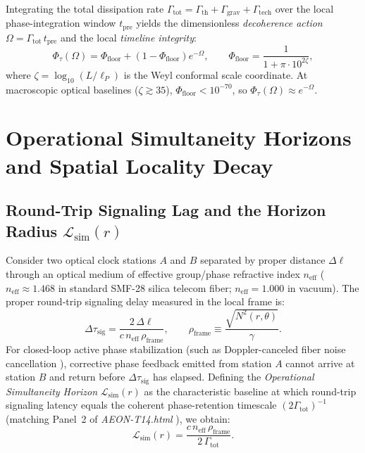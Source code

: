 \documentclass[11pt,a4paper]{article}
\begin{document}
Integrating the total dissipation rate $\Gamma_{\mathrm{tot}} = \Gamma_{\mathrm{th}} + \Gamma_{\mathrm{grav}} + \Gamma_{\mathrm{tech}}$ over the local phase-integration window $t_{\mathrm{pre}}$ yields the dimensionless \emph{decoherence action} $\Omega = \Gamma_{\mathrm{tot}}\,t_{\mathrm{pre}}$ and the local \emph{timeline integrity}:
\begin{equation}
\Phi_\tau(\Omega) = \Phi_{\mathrm{floor}} + \left(1 - \Phi_{\mathrm{floor}}\right)e^{-\Omega}, \qquad \Phi_{\mathrm{floor}} = \frac{1}{1 + \pi \cdot 10^{2\zeta}},
\label{eq:phitau}
\end{equation}
where $\zeta = \log_{10}(L / \ell_P)$ is the Weyl conformal scale coordinate. At macroscopic optical baselines ($\zeta \gtrsim 35$), $\Phi_{\mathrm{floor}} < 10^{-70}$, so $\Phi_\tau(\Omega) \approx e^{-\Omega}$.

\section{Operational Simultaneity Horizons and Spatial Locality Decay}

\subsection{Round-Trip Signaling Lag and the Horizon Radius $\mathcal{L}_{\mathrm{sim}}(r)$}

Consider two optical clock stations $A$ and $B$ separated by proper distance $\Delta\ell$ through an optical medium of effective group/phase refractive index $n_{\mathrm{eff}}$ ($n_{\mathrm{eff}} \approx 1.468$ in standard SMF-28 silica telecom fiber; $n_{\mathrm{eff}} = 1.000$ in vacuum). The proper round-trip signaling delay measured in the local frame is:
\begin{equation}
\Delta\tau_{\mathrm{sig}} = \frac{2\,\Delta\ell}{c\,n_{\mathrm{eff}}\,\rho_{\mathrm{frame}}}, \qquad \rho_{\mathrm{frame}} \equiv \frac{\sqrt{N^2(r,\theta)}}{\gamma}.
\label{eq:dtausig}
\end{equation}
For closed-loop active phase stabilization (such as Doppler-canceled fiber noise cancellation \cite{ma1994}), corrective phase feedback emitted from station $A$ cannot arrive at station $B$ and return before $\Delta\tau_{\mathrm{sig}}$ has elapsed. Defining the \emph{Operational Simultaneity Horizon} $\mathcal{L}_{\mathrm{sim}}(r)$ as the characteristic baseline at which round-trip signaling latency equals the coherent phase-retention timescale $(2\Gamma_{\mathrm{tot}})^{-1}$ (matching Panel~2 of \emph{AEON-T14.html} \cite{damasio2026observatory}), we obtain:
\begin{equation}
\mathcal{L}_{\mathrm{sim}}(r) = \frac{c\,n_{\mathrm{eff}}\,\rho_{\mathrm{frame}}}{2\,\Gamma_{\mathrm{tot}}}.
\label{eq:lsim}
\end{equation}
\end{document}
